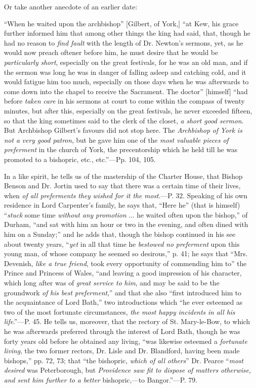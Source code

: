 Or take another anecdote of an earlier date:

``When he waited upon the archbishop'' [Gilbert, of York,]
``at Kew, his grace further informed him that among other things
the king had said, that, though he had no reason to \emph{find fault}
with the length of Dr. Newton's sermons, yet, as he would now preach
oftener before him, he must desire that he would be \emph{particularly
short}, especially on the great festivals, for he was an old man,
and if the sermon was long he was in danger of falling asleep and
catching cold, and it would fatigue him too much, especially on those
days when he was afterwards to come down into the chapel to receive
the Sacrament. The doctor'' [himself] ``had before \emph{taken
care} in his sermons at court to come within the compass of twenty
minutes, but after this, especially on the great festivals, he never
exceeded fifteen, so that the king sometimes said to the clerk of the
closet, \emph{a short good sermon}. But Archbishop Gilbert's favours
did not stop here. The \emph{Archbishop of York is not a very good patron},
but he gave him one of the \emph{most valuable pieces of preferment}
in the church of York, the precentorship which he held till he was
promoted to a bishopric, etc., etc.''—Pp. 104, 105.

In a like spirit, he tells us of the mastership of the Charter
House, that Bishop Benson and Dr. Jortin used to say that there was a
certain time of their lives, when \emph{of all preferments they wished
for it the most}.—P. 32. Speaking of his own residence in Lord
Carpenter's family, he says that, ``Here he'' (that is
himself) ``\emph{stuck} some time \emph{without any promotion} ...
he waited often upon the bishop,'' of Durham, ``and sat with
him an hour or two in the evening, and often dined with him on a
Sunday;'' and he adds that, though the bishop continued in his see
about twenty years, ``\emph{yet} in all that time he \emph{bestowed
no preferment} upon this young man, of whose company he seemed so
desirous,'' p. 41; he says that ``Mrs. Devenish, \emph{like a
true friend}, took every opportunity of commending him to'' the
Prince and Princess of Wales, ``and leaving a good impression of
his character, which long after was of \emph{great service to him},
and may be said to be the groundwork \emph{of his best preferment},''
and that she also ``first introduced him to the acquaintance of
Lord Bath,'' two introductions which ``he ever esteemed as two
of the most fortunate circumstances, \emph{the most happy incidents in
all his life}.''—P. 45. He tells us, moreover, that the
rectory of St. Mary-le-Bow, to which he was afterwards preferred
through the interest of Lord Bath, though he was forty years old
before he obtained any living, ``was likewise esteemed a \emph{fortunate
living}, the two former rectors, Dr. Lisle and Dr. Blandford,
having been made bishops,'' pp. 72, 73; that ``the bishopric, \emph{which
of all others}'' Dr. Pearce ``\emph{most desired} was
Peterborough, but \emph{Providence saw fit to dispose of matters
otherwise, and sent him further to a better} bishopric,—to
Bangor.''—P. 79.

